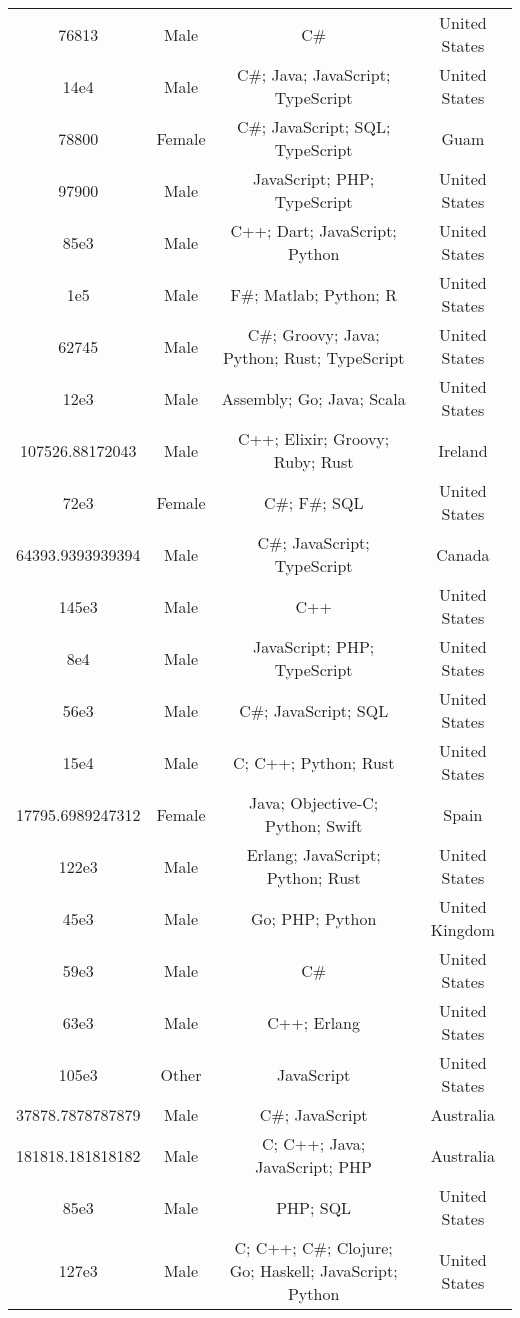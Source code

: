 \begin{center}
\begin{tabular}{ |c|c|c|c| }
76813  &  Male  &  C\#  &  United States  \\ 
14e4  &  Male  &  C\#; Java; JavaScript; TypeScript  &  United States  \\ 
78800  &  Female  &  C\#; JavaScript; SQL; TypeScript  &  Guam  \\ 
97900  &  Male  &  JavaScript; PHP; TypeScript  &  United States  \\ 
85e3  &  Male  &  C++; Dart; JavaScript; Python  &  United States  \\ 
1e5  &  Male  &  F\#; Matlab; Python; R  &  United States  \\ 
62745  &  Male  &  C\#; Groovy; Java; Python; Rust; TypeScript  &  United States  \\ 
12e3  &  Male  &  Assembly; Go; Java; Scala  &  United States  \\ 
107526.88172043  &  Male  &  C++; Elixir; Groovy; Ruby; Rust  &  Ireland  \\ 
72e3  &  Female  &  C\#; F\#; SQL  &  United States  \\ 
64393.9393939394  &  Male  &  C\#; JavaScript; TypeScript  &  Canada  \\ 
145e3  &  Male  &  C++  &  United States  \\ 
8e4  &  Male  &  JavaScript; PHP; TypeScript  &  United States  \\ 
56e3  &  Male  &  C\#; JavaScript; SQL  &  United States  \\ 
15e4  &  Male  &  C; C++; Python; Rust  &  United States  \\ 
17795.6989247312  &  Female  &  Java; Objective-C; Python; Swift  &  Spain  \\ 
122e3  &  Male  &  Erlang; JavaScript; Python; Rust  &  United States  \\ 
45e3  &  Male  &  Go; PHP; Python  &  United Kingdom  \\ 
59e3  &  Male  &  C\#  &  United States  \\ 
63e3  &  Male  &  C++; Erlang  &  United States  \\ 
105e3  &  Other  &  JavaScript  &  United States  \\ 
37878.7878787879  &  Male  &  C\#; JavaScript  &  Australia  \\ 
181818.181818182  &  Male  &  C; C++; Java; JavaScript; PHP  &  Australia  \\ 
85e3  &  Male  &  PHP; SQL  &  United States  \\ 
127e3  &  Male  &  C; C++; C\#; Clojure; Go; Haskell; JavaScript; Python  &  United States  \\ 

\end{tabular}
\end{center}
